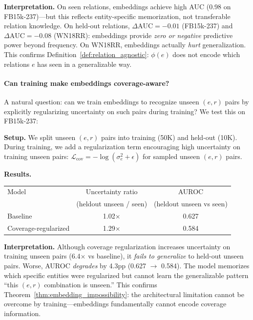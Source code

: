 \documentclass{article}
\begin{document}
\textbf{Interpretation.} On seen relations, embeddings achieve high AUC (0.98 on FB15k-237)---but this reflects entity-specific memorization, not transferable relation knowledge. On held-out relations, $\Delta\text{AUC} = -0.01$ (FB15k-237) and $\Delta\text{AUC} = -0.08$ (WN18RR): embeddings provide \emph{zero or negative} predictive power beyond frequency. On WN18RR, embeddings actually \emph{hurt} generalization. This confirms Definition~\ref{def:relation_agnostic}: $\phi(e)$ does not encode which relations $e$ has seen in a generalizable way.

\paragraph{Can training make embeddings coverage-aware?}
\label{app:coverage_training}
A natural question: can we train embeddings to recognize unseen $(e,r)$ pairs by explicitly regularizing uncertainty on such pairs during training? We test this on FB15k-237:

\textbf{Setup.} We split unseen $(e,r)$ pairs into training (50K) and held-out (10K). During training, we add a regularization term encouraging high uncertainty on training unseen pairs: $\mathcal{L}_{\text{cov}} = -\log(\sigma^2_e + \epsilon)$ for sampled unseen $(e,r)$ pairs.

\textbf{Results.}
\begin{center}
\small
\begin{tabular}{lcc}
\toprule
Model & Uncertainty ratio & AUROC \\
& (heldout unseen / seen) & (heldout unseen vs seen) \\
\midrule
Baseline & 1.02$\times$ & 0.627 \\
Coverage-regularized & 1.29$\times$ & 0.584 \\
\bottomrule
\end{tabular}
\end{center}

\textbf{Interpretation.} Although coverage regularization increases uncertainty on training unseen pairs (6.4$\times$ vs baseline), it \emph{fails to generalize} to held-out unseen pairs. Worse, AUROC \emph{degrades} by 4.3pp (0.627 $\to$ 0.584). The model memorizes which specific entities were regularized but cannot learn the generalizable pattern ``this $(e,r)$ combination is unseen.'' This confirms Theorem~\ref{thm:embedding_impossibility}: the architectural limitation cannot be overcome by training---embeddings fundamentally cannot encode coverage information.
\end{document}
